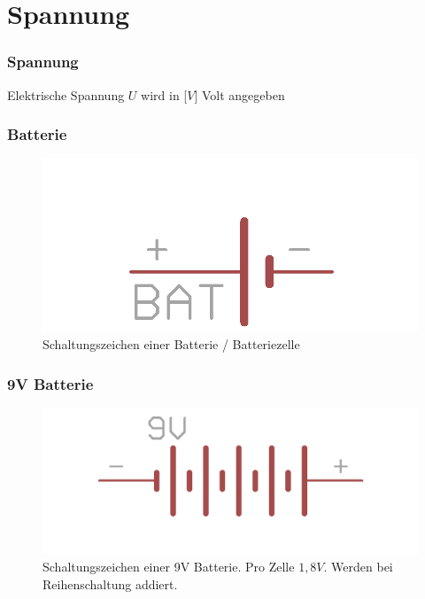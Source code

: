 \section*{Spannung}

\begin{frame}
  \frametitle{Spannung}
  \begin{center}
    Elektrische Spannung $U$ wird in [$V$] Volt angegeben
  \end{center}
\end{frame}

\begin{frame}
  \frametitle{Batterie}
  \begin{center}
    \begin{figure}
      \includegraphics[width=\textwidth,height=.5\textheight,keepaspectratio]{e02/batterieEagle.png}
      \caption{Schaltungszeichen einer Batterie / Batteriezelle}
    \end{figure}
  \end{center}
\end{frame}

\begin{frame}
  \frametitle{9V Batterie}
  \begin{center}
    \begin{figure}
      \includegraphics[width=\textwidth,height=.5\textheight,keepaspectratio]{e02/9vBatEagle.png}
      \caption{Schaltungszeichen einer 9V Batterie. Pro Zelle $1,8V$. Werden bei Reihenschaltung addiert.}
    \end{figure}
  \end{center}
\end{frame}

